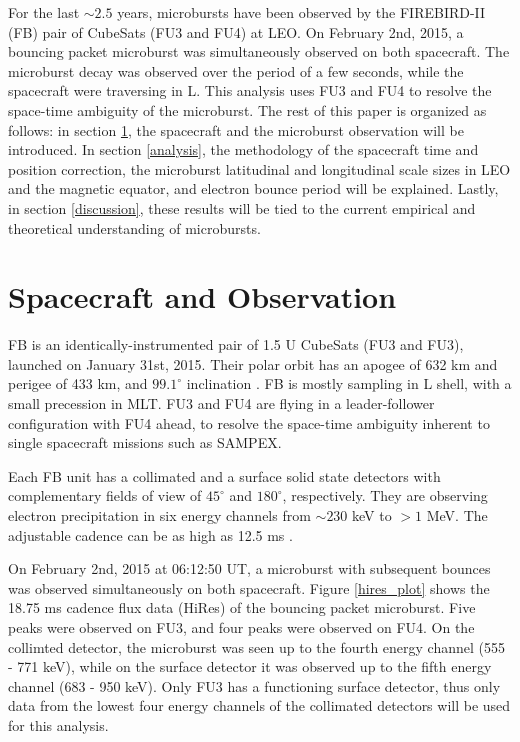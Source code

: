 \documentclass[draft,linenumbers]{agujournal}
\begin{document}
For the last $\sim 2.5$ years, microbursts have been observed by the FIREBIRD-II (FB) pair of CubeSats (FU3 and FU4) at LEO. On February 2nd, 2015, a bouncing packet microburst was simultaneously observed on both spacecraft. The microburst decay was observed over the period of a few seconds, while the spacecraft were traversing in L. This analysis uses FU3 and FU4 to resolve the space-time ambiguity of the microburst. The rest of this paper is organized as follows: in section \ref{obs}, the spacecraft and the microburst observation will be introduced. In section \ref{analysis}, the methodology of the spacecraft time and position correction, the microburst latitudinal and longitudinal scale sizes in LEO and the magnetic equator, and electron bounce period will be explained. Lastly, in section \ref{discussion}, these results will be tied to the current empirical and theoretical understanding of microbursts.

\section{Spacecraft and Observation} \label{obs} %
FB is an identically-instrumented pair of 1.5 U CubeSats (FU3 and FU3), launched on January 31st, 2015. Their polar orbit has an apogee of 632 km and perigee of 433 km, and $99.1^{\circ}$ inclination \citep{Crew16}. FB is mostly sampling in L shell, with a small precession in MLT. FU3 and FU4 are flying in a leader-follower configuration with FU4 ahead, to resolve the space-time ambiguity inherent to single spacecraft missions such as SAMPEX.

Each FB unit has a collimated and a surface solid state detectors with complementary fields of view of $45^{\circ}$ and $180^{\circ}$, respectively. They are observing electron precipitation in six energy channels from $\sim 230$ keV to $> 1$ MeV. The adjustable cadence can be as high as 12.5 ms \citep{Crew16}. 

On February 2nd, 2015 at 06:12:50 UT, a microburst with subsequent bounces was observed simultaneously on both spacecraft. Figure \ref{hires_plot} shows the 18.75 ms cadence flux data (HiRes) of the bouncing packet microburst. Five peaks were observed on FU3, and four peaks were observed on FU4. On the collimted detector, the microburst was seen up to the fourth energy channel (555 - 771 keV), while on the surface detector it was observed up to the fifth energy channel (683 - 950 keV). Only FU3 has a functioning surface detector, thus only data from the lowest four energy channels of the collimated detectors will be used for this analysis. 
\end{document}
